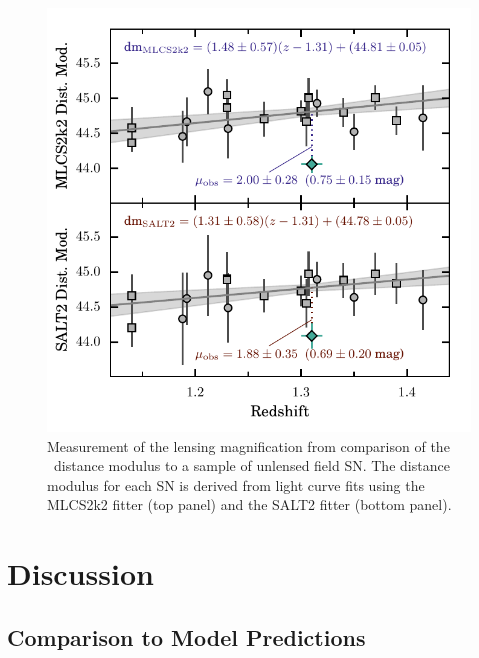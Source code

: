 \begin{figure}
\begin{center}
\includegraphics[width=\columnwidth]{FIG/snTomas_hubble_diagram}
\caption{ Measurement of the lensing magnification from comparison of
the \tomas\ distance modulus to a sample of unlensed field SN.
The distance modulus for each SN is derived from light curve fits
using the MLCS2k2 fitter (top panel) and the SALT2 fitter (bottom panel).
\label{fig:MagnificationMeasurement} }
\end{center}
\end{figure}


\section{Discussion}
\label{sec:Discussion}

\subsection{Comparison to Model Predictions}
\label{sec:ComparisonToModelPredictions}


